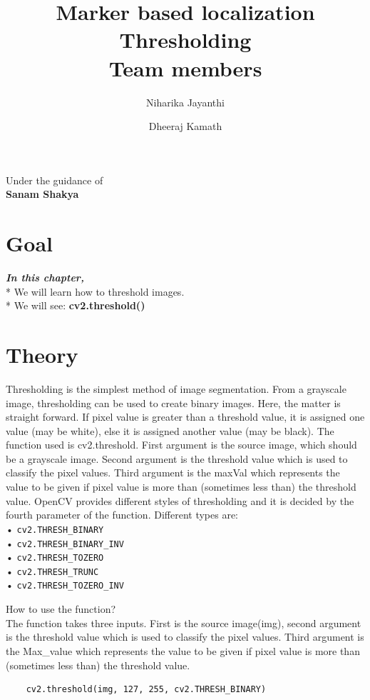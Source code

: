 \documentclass[]{article}
\date{}
\title {Marker based localization \\ [10pt]
	Thresholding  \\[25pt] Team members }
\author {Niharika Jayanthi \and Dheeraj Kamath}
\begin{document}
\maketitle
\begin{center}
	\begin{large}
		Under the guidance of\\
		\textbf{Sanam Shakya}\\
		\vspace{0.5in}
	\end{large}
\end{center}
\section{Goal}\label{goal}

\emph{\textbf{In this chapter,}} \\
* We will learn how to threshold images. \\
* We will see: \textbf{cv2.threshold()}

\section{Theory}\label{theory}

Thresholding is the simplest method of image segmentation. From a
grayscale image, thresholding can be used to create binary images. Here,
the matter is straight forward. If pixel value is greater than a
threshold value, it is assigned one value (may be white), else it is
assigned another value (may be black). The function used is
cv2.threshold. First argument is the source image, which should be a
grayscale image. Second argument is the threshold value which is used to
classify the pixel values. Third argument is the maxVal which represents
the value to be given if pixel value is more than (sometimes less than)
the threshold value. OpenCV provides different styles of thresholding
and it is decided by the fourth parameter of the function. Different
types are:\\
• \texttt{cv2.THRESH\_BINARY}\\
• \texttt{cv2.THRESH\_BINARY\_INV}\\
• \texttt{cv2.THRESH\_TOZERO}\\
• \texttt{cv2.THRESH\_TRUNC}\\
• \texttt{cv2.THRESH\_TOZERO\_INV}

How to use the function?\\
The function takes three inputs. First is the source image(img), second
argument is the threshold value which is used to classify the pixel
values. Third argument is the Max\_value which represents the value to
be given if pixel value is more than (sometimes less than) the threshold
value.
\begin{verbatim}
	cv2.threshold(img, 127, 255, cv2.THRESH_BINARY)
\end{verbatim}
\end{document}
